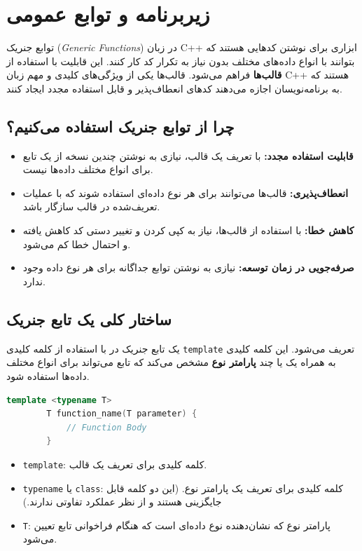 \documentclass[12pt, a4paper]{report}
\begin{document}
\section{زیربرنامه و توابع عمومی}
توابع جنریک (\textit{Generic Functions}) در زبان C++ ابزاری برای نوشتن کدهایی هستند که بتوانند با انواع داده‌های مختلف بدون نیاز به تکرار کد کار کنند. این قابلیت با استفاده از \textbf{قالب‌ها} فراهم می‌شود. قالب‌ها یکی از ویژگی‌های کلیدی و مهم زبان C++ هستند که به برنامه‌نویسان اجازه می‌دهند کدهای انعطاف‌پذیر و قابل استفاده مجدد ایجاد کنند.

\subsection{چرا از توابع جنریک استفاده می‌کنیم؟}
\begin{itemize}
	\item \textbf{قابلیت استفاده مجدد:} با تعریف یک قالب، نیازی به نوشتن چندین نسخه از یک تابع برای انواع مختلف داده‌ها نیست.
	\item \textbf{انعطاف‌پذیری:} قالب‌ها می‌توانند برای هر نوع داده‌ای استفاده شوند که با عملیات تعریف‌شده در قالب سازگار باشد.
	\item \textbf{کاهش خطا:} با استفاده از قالب‌ها، نیاز به کپی کردن و تغییر دستی کد کاهش یافته و احتمال خطا کم می‌شود.
	\item \textbf{صرفه‌جویی در زمان توسعه:} نیازی به نوشتن توابع جداگانه برای هر نوع داده وجود ندارد.
\end{itemize}

\subsection{ساختار کلی یک تابع جنریک}
یک تابع جنریک در  با استفاده از کلمه کلیدی \texttt{template} تعریف می‌شود. این کلمه کلیدی به همراه یک یا چند \textbf{پارامتر نوع} مشخص می‌کند که تابع می‌تواند برای انواع مختلف داده‌ها استفاده شود.

\begin{LTR}
	\begin{lstlisting}[language=C++, breaklines=true]
		template <typename T>
		T function_name(T parameter) {
			// Function Body
		}
	\end{lstlisting}
\end{LTR}

\begin{itemize}
	\item \texttt{template}: کلمه کلیدی برای تعریف یک قالب.
	\item \texttt{typename} یا \texttt{class}: کلمه کلیدی برای تعریف یک پارامتر نوع. (این دو کلمه قابل جایگزینی هستند و از نظر عملکرد تفاوتی ندارند.)
	\item \texttt{T}: پارامتر نوع که نشان‌دهنده نوع داده‌ای است که هنگام فراخوانی تابع تعیین می‌شود.
\end{itemize}
\end{document}
